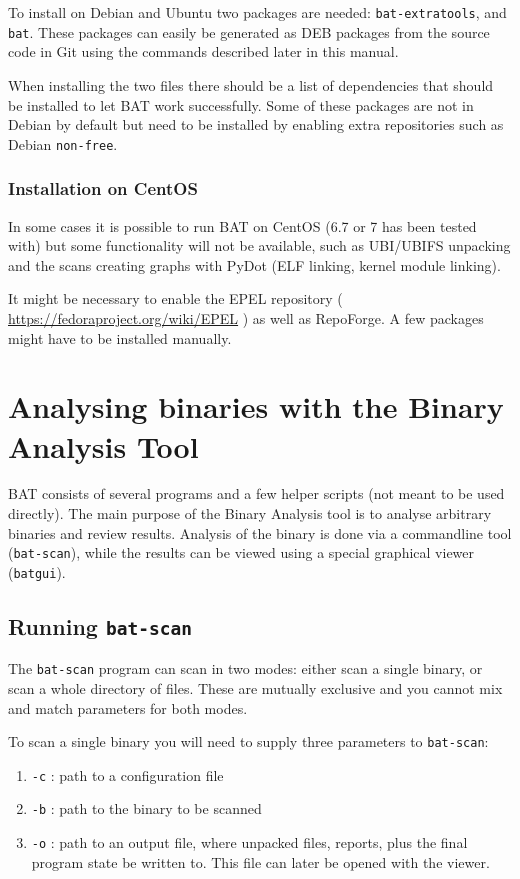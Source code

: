 \documentclass[10pt,a4paper]{article}
\begin{document}
To install on Debian and Ubuntu two packages are needed:
\texttt{bat-extratools}, %
and \texttt{bat}. These packages can easily be generated as DEB packages from
the source code in Git using the commands described later in this manual.

When installing the two files there should be a list of dependencies
that should be installed to let BAT work successfully. Some of these packages
are not in Debian by default but need to be installed by enabling extra
repositories such as Debian \texttt{non-free}.

\subsubsection{Installation on CentOS}

In some cases it is possible to run BAT on CentOS (6.7 or 7 has been tested
with) but some functionality will not be available, such as UBI/UBIFS
unpacking and the scans creating graphs with PyDot (ELF linking, kernel module
linking).

It might be necessary to enable the EPEL repository (
\url{https://fedoraproject.org/wiki/EPEL} ) as well as RepoForge. A few
packages might have to be installed manually.

\section{Analysing binaries with the Binary Analysis Tool}

BAT consists of several programs and a few helper scripts (not meant to be
used directly). The main purpose of the Binary Analysis tool is to analyse
arbitrary binaries and review results. Analysis of the binary is done via
a commandline tool (\texttt{bat-scan}), while the results can be viewed using
a special graphical viewer (\texttt{batgui}).

\subsection{Running \texttt{bat-scan}}

The \texttt{bat-scan} program can scan in two modes: either scan a single
binary, or scan a whole directory of files. These are mutually exclusive and
you cannot mix and match parameters for both modes.

To scan a single binary you will need to supply three parameters to
\texttt{bat-scan}:

\begin{enumerate}
\item \texttt{-c} : path to a configuration file
\item \texttt{-b} : path to the binary to be scanned
\item \texttt{-o} : path to an output file, where unpacked files, reports,
plus the final program state be written to. This file can later be opened with
the viewer.
\end{enumerate}
\end{document}
